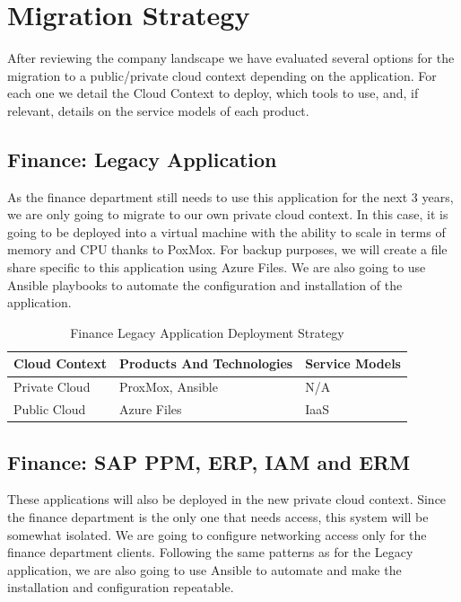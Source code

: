 \documentclass{llncs}
\begin{document}
\section{Migration Strategy}

After reviewing the company landscape we have evaluated several options for the migration to a public/private cloud context depending on the application.
For each one we detail the Cloud Context to deploy, which tools to use, and, if relevant, details on the service models of each product.

\subsection{Finance: Legacy Application}

As the finance department still needs to use this application for the next 3 years, we are only going to migrate to our own private cloud context.
In this case, it is going to be deployed into a virtual machine with the ability to scale in terms of memory and CPU thanks to PoxMox.
For backup purposes, we will create a file share specific to this application using Azure Files.
We are also going to use Ansible playbooks to automate the configuration and installation of the application.\\

\begin{table}[h!]
    \centering
    \begin{tabular}{lll}
        \hline
        \textbf{Cloud Context} & \textbf{Products And Technologies} & \textbf{Service Models} \\
        \hline
        Private Cloud          & ProxMox, Ansible                   & N/A                     \\
        \hline
        Public Cloud           & Azure Files                        & IaaS                    \\
        \hline
    \end{tabular}
    \caption{Finance Legacy Application Deployment Strategy}
\end{table}


\subsection{Finance: SAP PPM, ERP, IAM and ERM}
These applications will also be deployed in the new private cloud context.
Since the finance department is the only one that needs access, this system will be somewhat isolated.
We are going to configure networking access only for the finance department clients.
Following the same patterns as for the Legacy application, we are also going to use Ansible to automate and make the installation and configuration repeatable.\\
\end{document}
